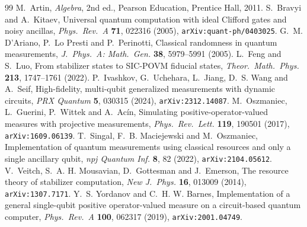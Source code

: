 \documentclass[11pt,a4paper]{article}
\begin{document}
\begin{thebibliography}{99}
 M.~Artin, \emph{Algebra}, 2nd ed., Pearson Education, Prentice Hall, 2011.
 S.~Bravyi and A.~Kitaev, Universal quantum computation with ideal Clifford gates and noisy ancillas, \emph{Phys.\ Rev.\ A} \textbf{71}, 022316 (2005), \texttt{arXiv:quant-ph/0403025}.
 G.~M. D'Ariano, P.~Lo Presti and P.~Perinotti, Classical randomness in quantum measurements, \emph{J.\ Phys.\ A: Math.\ Gen.} \textbf{38}, 5979--5991 (2005).
 L.~Feng and S.~Luo, From stabilizer states to SIC-POVM fiducial states, \emph{Theor.\ Math.\ Phys.} \textbf{213}, 1747--1761 (2022).
 P.~Ivashkov, G.~Uchehara, L.~Jiang, D.~S. Wang and A.~Seif, High-fidelity, multi-qubit generalized measurements with dynamic circuits, \emph{PRX Quantum} \textbf{5}, 030315 (2024), \texttt{arXiv:2312.14087}.
 M.~Oszmaniec, L.~Guerini, P.~Wittek and A.~Ac\'in, Simulating positive-operator-valued measures with projective measurements, \emph{Phys.\ Rev.\ Lett.} \textbf{119}, 190501 (2017), \texttt{arXiv:1609.06139}.
 T.~Singal, F.~B. Maciejewski and M.~Oszmaniec, Implementation of quantum measurements using classical resources and only a single ancillary qubit, \emph{npj Quantum Inf.} \textbf{8}, 82 (2022), \texttt{arXiv:2104.05612}.
 V.~Veitch, S.~A. H. Mousavian, D.~Gottesman and J.~Emerson, The resource theory of stabilizer computation, \emph{New J.\ Phys.} \textbf{16}, 013009 (2014), \texttt{arXiv:1307.7171}.
 Y.~S. Yordanov and C.~H. W. Barnes, Implementation of a general single-qubit positive operator-valued measure on a circuit-based quantum computer, \emph{Phys.\ Rev.\ A} \textbf{100}, 062317 (2019), \texttt{arXiv:2001.04749}.
\end{thebibliography}
\end{document}
